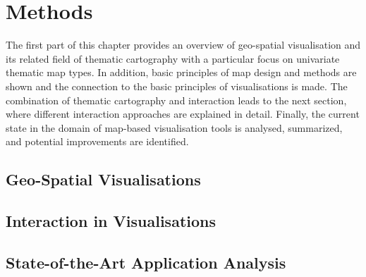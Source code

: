 \section{Methods}
\label{s:methods}
The first part of this chapter provides an overview of geo-spatial visualisation and its related field of thematic cartography with a particular focus on univariate thematic map types. In addition, basic principles of map design and methods are shown and the connection to the basic principles of visualisations is made.
The combination of thematic cartography and interaction leads to the next section, where different interaction approaches are explained in detail. Finally, the current state in the domain of map-based visualisation tools is analysed, summarized, and potential improvements are identified.

\subsection{Geo-Spatial Visualisations}
\label{s:cartography}


% 

\subsection{Interaction in Visualisations}
\label{s:interaction}


\subsection{State-of-the-Art Application Analysis}
